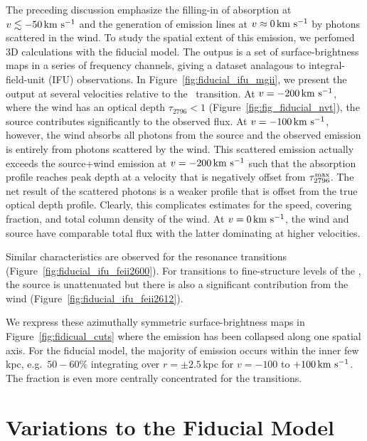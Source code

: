 \documentclass[12pt,preprint]{aastex}
\begin{document}
The preceding discussion emphasize the filling-in of absorption at $v
\lesssim -50 \, {\rm km~s^{-1}}$ and the generation of emission lines at $v \approx
0 \, {\rm km~s^{-1}}$ by photons scattered in the wind.  To study the spatial
extent of this emission, we perfomed 3D calculations with the fiducial
model.  The outpus is a set of surface-brightness maps in a series of
frequency channels, giving a
dataset analagous to integral-field-unit (IFU) observations.  In
Figure~\ref{fig:fiducial_ifu_mgii}, we present the output 
at several velocities relative to the \mgiia\
transition. At $v = -200 \, {\rm km~s^{-1}}$, where the wind has an optical
depth $\tau_{2796} < 1$ (Figure~\ref{fig:fig_fiducial_nvt}),
the source contributes significantly to the observed flux.  
At $v=-100 \, {\rm km~s^{-1}}$, however, the
wind absorbs all photons from the source and the observed emission is
entirely from photons scattered by the wind.  This scattered emission
actually exceeds the source+wind emission at 
$v = -200 \, {\rm km~s^{-1}}$ such
that the absorption profile reaches peak depth at a velocity that is
negatively offset from $\tau_{2796}^{\rm max}$.
The net result of the scattered photons is
a weaker  profile that is offset from the true optical
depth profile.  Clearly, this complicates estimates for the
speed, covering fraction, and total column density of the wind.  At $v
= 0 \, {\rm km~s^{-1}}$, the wind and source have comparable total flux with the
latter dominating at higher velocities.  

Similar characteristics are observed for the  resonance
transitions (Figure~\ref{fig:fiducial_ifu_feii2600}).
For transitions to fine-structure levels of the \aconfig, the source
is unattenuated but there is also a significant contribution from the
wind (Figure~\ref{fig:fiducial_ifu_feii2612}).

We rexpress these azimuthally symmetric surface-brightness maps in
Figure~\ref{fig:fidicual_cuts} where the emission has been collapsed
along one spatial axis.  For the fiducial model, the majority of
\ion{Mg}{2} emission occurs within the inner few kpc, e.g.\ $50-60\%$ integrating
over $r = \pm 2.5$\,kpc for $v=-100$ to $+100 \, {\rm km~s^{-1}}$.  The fraction
is even more centrally concentrated for the \ion{Fe}{2} transitions.


\section{Variations to the Fiducial Model}
\end{document}
